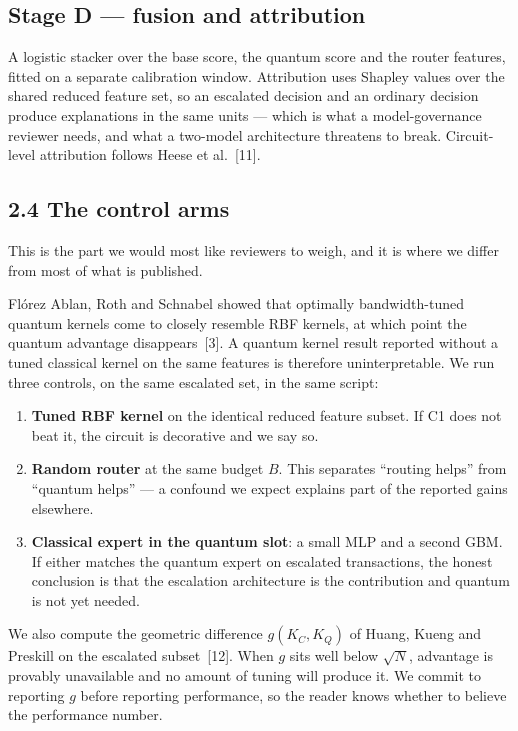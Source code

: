 \documentclass[10pt,a4paper]{article}
\begin{document}
\subsection*{Stage D --- fusion and attribution}
A logistic stacker over the base score, the quantum score and the router features, fitted on a separate calibration window. Attribution uses Shapley values over the shared reduced feature set, so an escalated decision and an ordinary decision produce explanations in the same units --- which is what a model-governance reviewer needs, and what a two-model architecture threatens to break. Circuit-level attribution follows Heese et al.~[11].

\subsection*{2.4 The control arms}

This is the part we would most like reviewers to weigh, and it is where we differ from most of what is published.

Flórez Ablan, Roth and Schnabel showed that optimally bandwidth-tuned quantum kernels come to closely resemble RBF kernels, at which point the quantum advantage disappears~[3]. A quantum kernel result reported without a tuned classical kernel on the same features is therefore uninterpretable. We run three controls, on the same escalated set, in the same script:

\begin{enumerate}
\item \textbf{Tuned RBF kernel} on the identical reduced feature subset. If C1 does not beat it, the circuit is decorative and we say so.
\item \textbf{Random router} at the same budget $B$. This separates ``routing helps'' from ``quantum helps'' --- a confound we expect explains part of the reported gains elsewhere.
\item \textbf{Classical expert in the quantum slot}: a small MLP and a second GBM. If either matches the quantum expert on escalated transactions, the honest conclusion is that the escalation architecture is the contribution and quantum is not yet needed.
\end{enumerate}

We also compute the geometric difference $g(K_C,K_Q)$ of Huang, Kueng and Preskill on the escalated subset~[12]. When $g$ sits well below $\sqrt{N}$, advantage is provably unavailable and no amount of tuning will produce it. We commit to reporting $g$ before reporting performance, so the reader knows whether to believe the performance number.
\end{document}
